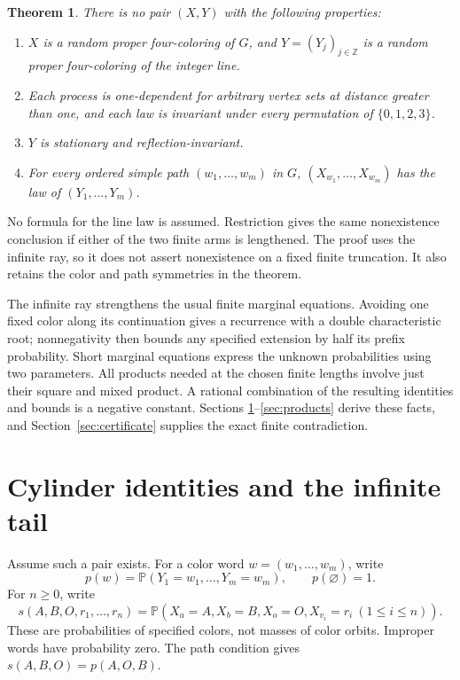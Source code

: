 \documentclass[11pt]{article}
\newtheorem{theorem}{Theorem}
\newcommand{\Prob}{\mathbb P}
\newcommand{\C}{\{0,1,2,3\}}
\begin{document}
\begin{theorem}\label{thm:main}
There is no pair $(X,Y)$ with the following properties:
\begin{enumerate}
\item $X$ is a random proper four-coloring of $G$, and
$Y=(Y_j)_{j\in\mathbb Z}$ is a random proper four-coloring of the integer line.
\item Each process is one-dependent for arbitrary vertex sets at distance
greater than one, and each law is invariant under every permutation of $\C$.
\item $Y$ is stationary and reflection-invariant.
\item For every ordered simple path $(w_1,\ldots,w_m)$ in $G$,
$(X_{w_1},\ldots,X_{w_m})$ has the law of $(Y_1,\ldots,Y_m)$.
\end{enumerate}
\end{theorem}

No formula for the line law is assumed. Restriction gives the same
nonexistence conclusion if either of the two finite arms is lengthened.
The proof uses the infinite ray, so it does not assert nonexistence on a
fixed finite truncation. It also retains the color and path symmetries in
the theorem.

The infinite ray strengthens the usual finite marginal equations. Avoiding
one fixed color along its continuation gives a recurrence with a double
characteristic root; nonnegativity then bounds any specified extension by
half its prefix probability. Short marginal equations express the unknown
probabilities using two parameters. All products needed at the chosen finite
lengths involve just their square and mixed product. A rational combination
of the resulting identities and bounds is a negative constant. Sections
\ref{sec:cylinders}--\ref{sec:products} derive these facts, and
Section~\ref{sec:certificate} supplies the exact finite contradiction.

\section{Cylinder identities and the infinite tail}\label{sec:cylinders}
Assume such a pair exists. For a color word $w=(w_1,\ldots,w_m)$, write
\[
p(w)=\Prob(Y_1=w_1,\ldots,Y_m=w_m),\qquad p(\varnothing)=1.
\]
For $n\geq0$, write
\[
s(A,B,O,r_1,\ldots,r_n)
=\Prob(X_a=A,X_b=B,X_o=O,X_{v_i}=r_i\ (1\leq i\leq n)).
\]
These are probabilities of specified colors, not masses of color orbits.
Improper words have probability zero. The path condition gives
$s(A,B,O)=p(A,O,B)$.
\end{document}
